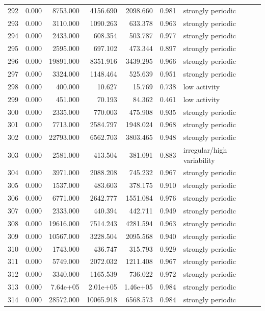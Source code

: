 \begin{longtable}{lrrrrrl}
292 & 0.000 & 8753.000 & 4156.690 & 2098.660 & 0.981 & strongly periodic \\
293 & 0.000 & 3110.000 & 1090.263 & 633.378 & 0.963 & strongly periodic \\
294 & 0.000 & 2433.000 & 608.354 & 503.787 & 0.977 & strongly periodic \\
295 & 0.000 & 2595.000 & 697.102 & 473.344 & 0.897 & strongly periodic \\
296 & 0.000 & 19891.000 & 8351.916 & 3439.295 & 0.966 & strongly periodic \\
297 & 0.000 & 3324.000 & 1148.464 & 525.639 & 0.951 & strongly periodic \\
298 & 0.000 & 400.000 & 10.627 & 15.769 & 0.738 & low activity \\
299 & 0.000 & 451.000 & 70.193 & 84.362 & 0.461 & low activity \\
300 & 0.000 & 2335.000 & 770.003 & 475.908 & 0.935 & strongly periodic \\
301 & 0.000 & 7713.000 & 2584.797 & 1948.024 & 0.968 & strongly periodic \\
302 & 0.000 & 22793.000 & 6562.703 & 3803.465 & 0.948 & strongly periodic \\
303 & 0.000 & 2581.000 & 413.504 & 381.091 & 0.883 & irregular/high variability \\
304 & 0.000 & 3971.000 & 2088.208 & 745.232 & 0.967 & strongly periodic \\
305 & 0.000 & 1537.000 & 483.603 & 378.175 & 0.910 & strongly periodic \\
306 & 0.000 & 6771.000 & 2642.777 & 1551.084 & 0.976 & strongly periodic \\
307 & 0.000 & 2333.000 & 440.394 & 442.711 & 0.949 & strongly periodic \\
308 & 0.000 & 19616.000 & 7514.243 & 4281.594 & 0.963 & strongly periodic \\
309 & 0.000 & 10567.000 & 3228.504 & 2095.568 & 0.940 & strongly periodic \\
310 & 0.000 & 1743.000 & 436.747 & 315.793 & 0.929 & strongly periodic \\
311 & 0.000 & 5749.000 & 2072.032 & 1211.408 & 0.967 & strongly periodic \\
312 & 0.000 & 3340.000 & 1165.539 & 736.022 & 0.972 & strongly periodic \\
313 & 0.000 & 7.64e+05 & 2.01e+05 & 1.46e+05 & 0.984 & strongly periodic \\
314 & 0.000 & 28572.000 & 10065.918 & 6568.573 & 0.984 & strongly periodic \\

\end{longtable}
